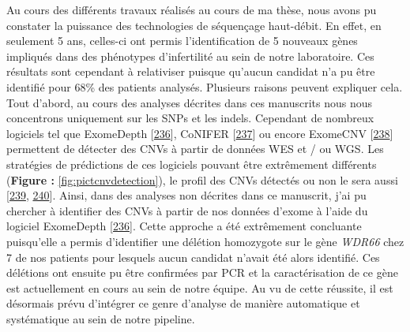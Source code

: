 \documentclass[12pt,a4paper,twoside]{ugathesis}
\theoremstyle{definition}
\theoremstyle{definition}
\theoremstyle{definition}
\theoremstyle{remark}
\begin{document}
Au cours des différents travaux réalisés au cours de ma thèse, nous
avons pu constater la puissance des technologies de séquençage
haut-débit. En effet, en seulement 5 ans, celles-ci ont permis
l'identification de 5 nouveaux gènes impliqués dans des phénotypes
d'infertilité au sein de notre laboratoire. Ces résultats sont cependant
à relativiser puisque qu'aucun candidat n'a pu être identifié pour 68\%
des patients analysés. Plusieurs raisons peuvent expliquer cela. Tout
d'abord, au cours des analyses décrites dans ces manuscrits nous nous
concentrons uniquement sur les SNPs et les indels. Cependant de nombreux
logiciels tel que ExomeDepth
{[}\protect\hyperlink{ref-Plagnol2012}{236}{]}, CoNIFER
{[}\protect\hyperlink{ref-Krumm2012}{237}{]} ou encore ExomeCNV
{[}\protect\hyperlink{ref-Sathirapongsasuti2011}{238}{]} permettent de
détecter des CNVs à partir de données WES et / ou WGS. Les stratégies de
prédictions de ces logiciels pouvant être extrêmement différents
(\textbf{Figure : }\ref{fig:pictcnvdetection}), le profil des CNVs
détectés ou non le sera aussi {[}\protect\hyperlink{ref-Zhao2013}{239},
\protect\hyperlink{ref-Guo2013}{240}{]}. Ainsi, dans des analyses non
décrites dans ce manuscrit, j'ai pu chercher à identifier des CNVs à
partir de nos données d'exome à l'aide du logiciel ExomeDepth
{[}\protect\hyperlink{ref-Plagnol2012}{236}{]}. Cette approche a été
extrêmement concluante puisqu'elle a permis d'identifier une délétion
homozygote sur le gène \emph{WDR66} chez 7 de nos patients pour lesquels
aucun candidat n'avait été alors identifié. Ces délétions ont ensuite pu
être confirmées par PCR et la caractérisation de ce gène est
actuellement en cours au sein de notre équipe. Au vu de cette réussite,
il est désormais prévu d'intégrer ce genre d'analyse de manière
automatique et systématique au sein de notre pipeline.
\end{document}
